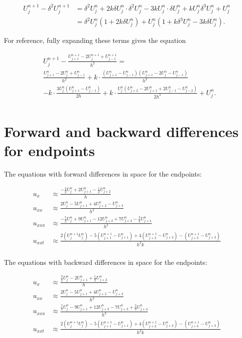 \documentclass[fleqn]{article}
\begin{document}
\begin{align*}
U_j^{n+1} - \delta^2 U_j^{n+1} &= \delta^2 U_j^n + 2k\delta U_j^n \cdot \delta ^2U_j^n - 3 k U_j^n \cdot \delta U_j^n + k U_j^n \delta^3 U_j^n + U_j^n \\
&= \delta^2 U_j^n \left( 1 + 2k \delta U_j^n \right) + U_j^n \left(1 + k \delta^3 U_j^n - 3 k \delta U_j^n \right).
\end{align*}

For reference, fully expanding these terms gives the equation

\begin{align*}
&U_{j}^{n+1} - \frac{U_{j+1}^{n+1}-2U_{j}^{n+1}+U_{j-1}^{n+1}}{h^{2}} = \\
&\frac{U_{j+1}^n - 2U_j^n + U_{j-1}^n}{h^2} +k \cdot \frac{\left(U_{j+1}^n - U_{j-1}^n\right)\left(U_{j+1}^n-2U_{j}^n-U_{j-1}^n\right)}{h^{3}}\\
&-k \cdot \frac{3U_{j}^n\left(U_{j+1}^n-U_{j-1}^n\right)}{2h} +k \cdot \frac{U_{j}^n\left(U_{j+2}^n-2U_{j+1}^n+2U_{j-1}^n-U_{j-2}^n\right)}{2h^{3}} + U_{j}^n.\\
\end{align*}


\section*{Forward and backward differences for endpoints}
The equations with forward differences in space for the endpoints:

\begin{align*}
u_x &\approx \frac{-\frac{3}{2}U_j^n+2U_{j+1}^n-\frac{1}{2}U_{j+2}^n}{h} \\
u_{xx} &\approx \frac{2U_j^n-5U_{j+1}^n+4U_{j+2}^n-U_{j+3}^n}{h^{2}} \\
u_{xxx} &\approx \frac{-\frac{5}{2}U_j^n+9U_{j+1}^n-12U_{j+2}^n+7U_{j+3}^n-\frac{3}{2}U_{j+4}^n}{h^{3}} \\
u_{xxt} &\approx \frac{2\left(U_j^{n+1}U_j^n\right)-5\left(U_{j+1}^{n+1}-U_{j+1}^{n}\right)+4\left(U_{j+2}^{n+1}-U_{j+2}^n\right)-\left(U_{j+3}^{n+1}-U_{j+3}^n\right)}{h^{2}k} \\
\end{align*}

The equations with backward differences in space for the endpoints:

\begin{align*}
u_x &\approx \frac{\frac{3}{2}U_j^n-2U_{j+1}^n+\frac{1}{2}U_{j+2}^n}{h} \\
u_{xx} &\approx \frac{2U_j^n-5U_{j+1}^n+4U_{j+2}^n-U_{j+3}^n}{h^{2}} \\
u_{xxx} &\approx \frac{\frac{5}{2}U_j^n-9U_{j+1}^n+12U_{j+2}^n-7U_{j+3}^n+\frac{3}{2}U_{j+4}^n}{h^{3}} \\
u_{xxt} &\approx \frac{2\left(U_j^{n+1}U_j^n\right)-5\left(U_{j+1}^{n+1}-U_{j+1}^{n}\right)+4\left(U_{j+2}^{n+1}-U_{j+2}^n\right)-\left(U_{j+3}^{n+1}-U_{j+3}^n\right)}{h^{2}k} \\
\end{align*}
\end{document}
